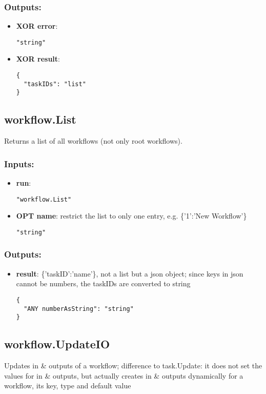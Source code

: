 \subsubsection*{Outputs:}
\begin{itemize}
    \item \textbf{XOR error}: 
\begin{lstlisting}
"string"
\end{lstlisting}
    \item \textbf{XOR result}: 
\begin{lstlisting}
{
  "taskIDs": "list"
}
\end{lstlisting}
  \end{itemize}

\subsection{workflow.List}
Returns a list of all workflows (not only root workflows).
\subsubsection*{Inputs:}
\begin{itemize}
    \item \textbf{run}: 
\begin{lstlisting}
"workflow.List"
\end{lstlisting}
    \item \textbf{OPT name}: restrict the list to only one entry, e.g. \{'1':'New Workflow'\}
\begin{lstlisting}
"string"
\end{lstlisting}
  \end{itemize}

\subsubsection*{Outputs:}
\begin{itemize}
    \item \textbf{result}: \{'taskID':'name'\}, not a list but a json object; since keys in json cannot be numbers, the taskIDs are converted to string
\begin{lstlisting}
{
  "ANY numberAsString": "string"
}
\end{lstlisting}
  \end{itemize}

\subsection{workflow.UpdateIO}
Updates
 in \& outputs of a workflow; difference to task.Update: it does not 
set the values for in \& outputs, but actually creates in \& 
outputs dynamically for a workflow, its key, type and default value
